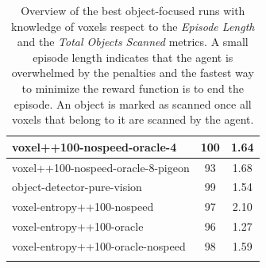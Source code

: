\begin{longtable}{|l|c|c|}
voxel++100-nospeed-oracle-4 & 100 & {\cellcolor[HTML]{A9D2CA}} \color[HTML]{000000} 1.64 \\ \hline
voxel++100-nospeed-oracle-8-pigeon & 93 & {\cellcolor[HTML]{A1CFC5}} \color[HTML]{000000} 1.68 \\ \hline
object-detector-pure-vision & 99 & {\cellcolor[HTML]{BADBD4}} \color[HTML]{000000} 1.54 \\ \hline
voxel-entropy++100-nospeed & 97 & {\cellcolor[HTML]{55AA99}} \color[HTML]{000000} 2.10 \\ \hline
voxel-entropy++100-oracle & 96 & {\cellcolor[HTML]{EBF2F0}} \color[HTML]{000000} 1.27 \\ \hline
voxel-entropy++100-oracle-nospeed & 98 & {\cellcolor[HTML]{B1D6CE}} \color[HTML]{000000} 1.59 \\ \hline


    \caption{Overview of the best object-focused runs with knowledge of voxels respect to the \textit{Episode Length} and the \textit{Total Objects Scanned} metrics. A small episode length indicates that the agent is overwhelmed by the penalties and the fastest way to minimize the reward function is to end the episode. An object is marked as scanned once all voxels that belong to it are scanned by the agent.
    } \label{tab:RQ1-results}
\end{longtable}

